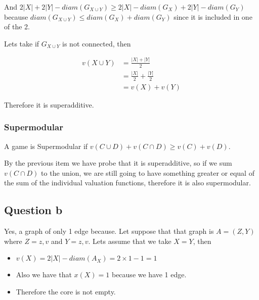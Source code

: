 \documentclass[12pt, a4paper]{article}
\begin{document}
And $2|X| + 2|Y| - diam(G_{X \cup Y}) \geq 2|X| - diam(G_X) + 2|Y| - diam(G_Y)$ because $diam(G_{X \cup Y}) \leq diam(G_X) + diam(G_Y)$ since it is included in one of the 2.

Lets take if $G_{X \cup Y}$ is not connected, then 

\begin{subequations}
  \begin{align}
    v(X \cup Y) &= \frac{|X| + |Y|}{2}\\
                &= \frac{|X|}{2} + \frac{|Y|}{2}\\
                &= v(X) + v(Y)
  \end{align}
\end{subequations}

Therefore it is superadditive.

\subsubsection{Supermodular}
A game is Supermodular if $v(C \cup D) + v(C \cap D) \geq v(C) + v(D)$.

By the previous item we have probe that it is superadditive, so if we sum $v(C \cap D)$ to the union, we are still going to have something
greater or equal of the sum of the individual valuation functions, therefore it is also supermodular.

\subsection{Question b}
Yes, a graph of only 1 edge because. Let suppose that that graph is $A = (Z, Y)$ where $Z={z,v}$ and $Y = {z,v}$. 
Lets assume that we take $X = Y$, then

\begin{itemize}
  \item $v(X) = 2 |X| - diam(A_X) = 2 \times 1 - 1 = 1$ 
  \item Also we have that $x(X) = 1$ because we have 1 edge.
  \item Therefore the core is not empty.
\end{itemize}
\end{document}
